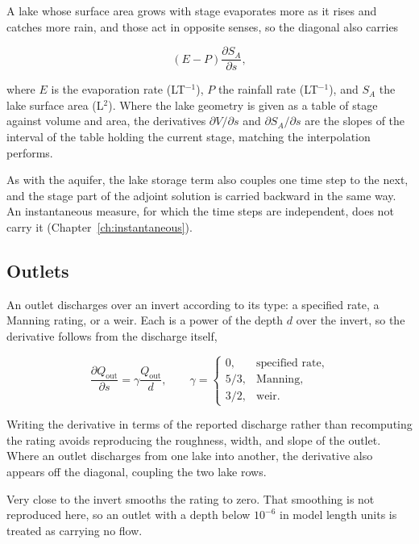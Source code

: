A lake whose surface area grows with stage evaporates more as it rises and catches more rain, and those act in opposite senses, so the diagonal also carries

\begin{equation}
	\label{eqn:lak-surface}
	\left( E - P \right) \frac{\partial S_{A}}{\partial s},
\end{equation}

\noindent where $E$ is the evaporation rate (LT$^{-1}$), $P$ the rainfall rate (LT$^{-1}$), and $S_{A}$ the lake surface area (L$^{2}$). Where the lake geometry is given as a table of stage against volume and area, the derivatives $\partial V / \partial s$ and $\partial S_A / \partial s$ are the slopes of the interval of the table holding the current stage, matching the interpolation \mf{} performs.

As with the aquifer, the lake storage term also couples one time step to the next, and the stage part of the adjoint solution is carried backward in the same way. An instantaneous measure, for which the time steps are independent, does not carry it (Chapter~\ref{ch:instantaneous}).

\subsection*{Outlets}

An outlet discharges over an invert according to its type: a specified rate, a Manning rating, or a weir. Each is a power of the depth $d$ over the invert, so the derivative follows from the discharge itself,

\begin{equation}
	\label{eqn:lak-outlet}
	\frac{\partial Q_{\mathrm{out}}}{\partial s} = \gamma
	\frac{Q_{\mathrm{out}}}{d}, \qquad
	\gamma = \begin{cases}
		0, & \text{specified rate}, \\
		5/3, & \text{Manning}, \\
		3/2, & \text{weir}.
	\end{cases}
\end{equation}

Writing the derivative in terms of the reported discharge rather than recomputing the rating avoids reproducing the roughness, width, and slope of the outlet. Where an outlet discharges from one lake into another, the derivative also appears off the diagonal, coupling the two lake rows.

Very close to the invert \mf{} smooths the rating to zero. That smoothing is not reproduced here, so an outlet with a depth below $10^{-6}$ in model length units is treated as carrying no flow.

